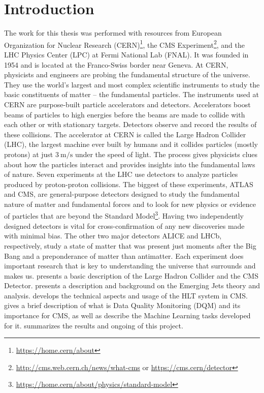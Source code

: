\chapter{Introduction}

The work for this thesis was performed with resources from European Organization for Nuclear Research (CERN)\footnote{\url{https://home.cern/about}}, the CMS Experiment\footnote{\url{http://cms.web.cern.ch/news/what-cms} or \url{https://cms.cern/detector}}, and the LHC Physics Center (LPC) at Fermi National Lab (FNAL).
It was founded in 1954 and is located at the Franco-Swiss border near Geneva. At CERN, physicists and engineers are probing the fundamental structure of the universe. They use the world's largest and most complex scientific instruments to study the basic constituents of matter – the fundamental particles.
The instruments used at CERN are purpose-built particle accelerators and detectors. Accelerators boost beams of particles to high energies before the beams are made to collide with each other or with stationary targets. Detectors observe and record the results of these collisions. The accelerator at CERN is called the Large Hadron Collider (LHC), the largest machine ever built by humans and it collides particles (mostly protons) at just
$\qty[per-mode = symbol]{3}{\meter\per\second}$ under the speed of light.
The process gives physicists clues about how the particles interact and provides insights into the fundamental laws of nature. Seven experiments at the LHC use detectors to analyze particles produced by proton-proton collisions. The biggest of these experiments, ATLAS and CMS, are general-purpose detectors designed to study the
fundamental nature of matter and fundamental forces and to look for new physics or evidence of particles that are beyond the Standard Model\footnote{\url{https://home.cern/about/physics/standard-model}}. Having two independently designed detectors is vital for cross-confirmation of any new discoveries made with minimal bias. The other two major detectors ALICE and LHCb, respectively, study a state of matter that was present just moments after the Big Bang and a preponderance of matter than antimatter.  Each experiment does important research that is key to understanding the universe that surrounds and makes us.
 presents a basic description of the Large Hadron Collider and the CMS Detector.
 presents a description and background on the Emerging Jets theory and analysis.
 develops the technical aspects and usage of the HLT system in CMS.
 gives a brief description of what is Data Quality Monitoring (DQM) and its importance for CMS, as well as describe the Machine Learning tasks developed for it.
 summarizes the results and ongoing of this project.
